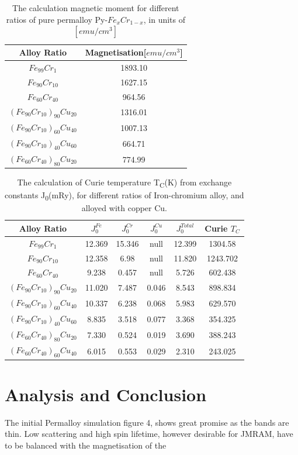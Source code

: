 \documentclass[12pt]{article}
\begin{document}
\begin{table}[h!]
\centering
 \begin{tabular}{||c c||} 
 \hline
 Alloy Ratio & Magnetisation[$emu/cm^3$] \\ [1ex] 
 \hline\hline
 $Fe_{99}Cr_1$ & 1893.10\\ 
 $Fe_{90}Cr_{10}$ & 1627.15\\
 $Fe_{60}Cr_{40}$ & 964.56 \\
 $(Fe_{90}Cr_{10})_{90}Cu_{20}$ & 1316.01\\ 
 $(Fe_{90}Cr_{10})_{60}Cu_{40}$ & 1007.13\\  
 $(Fe_{90}Cr_{10})_{40}Cu_{60}$ & 664.71\\
 $(Fe_{60}Cr_{40})_{80}Cu_{20}$ & 774.99\\ [1ex]
 \hline
 \end{tabular}
\caption{The calculation magnetic moment for different ratios of pure permalloy Py-$Fe_{x}Cr_{1-x}$, in units of $[emu/cm^3]$} 
\end{table}

\begin{table}[h!]
\centering
 \begin{tabular}{||c c c c c c||} 
 \hline
 Alloy Ratio & $J_0^{Fe}$ & $J_0^{Cr}$ & $J_0^{Cu}$ & $J_0^{Total}$ & Curie $T_C$ \\ [1ex] 
 \hline\hline
 $Fe_{99}Cr_1$ & 12.369 & 15.346 & null & 12.399 & 1304.58 \\ 
 $Fe_{90}Cr_{10}$ & 12.358 & 6.98 & null & 11.820 & 1243.702\\
 $Fe_{60}Cr_{40}$ & 9.238 & 0.457 & null & 5.726 & 602.438 \\
 $(Fe_{90}Cr_{10})_{90}Cu_{20}$ & 11.020 & 7.487 & 0.046 & 8.543 & 898.834 \\ 
 $(Fe_{90}Cr_{10})_{60}Cu_{40}$ & 10.337 & 6.238 & 0.068 & 5.983 & 629.570 \\
 $(Fe_{90}Cr_{10})_{40}Cu_{60}$ & 8.835 & 3.518 & 0.077 & 3.368 & 354.325 \\ 
 $(Fe_{60}Cr_{40})_{80}Cu_{20}$ & 7.330 & 0.524 & 0.019 & 3.690 & 388.243 \\
 $(Fe_{60}Cr_{40})_{60}Cu_{40}$ & 6.015 & 0.553 & 0.029 & 2.310 & 243.025 \\ [1ex]
 \hline
 \end{tabular}
\caption{The calculation of Curie temperature T\textsubscript{C}(K) from exchange constants J\textsubscript{0}(mRy), for different ratios of Iron-chromium alloy, and alloyed with copper Cu.} 
\end{table}
\clearpage








\section{Analysis and Conclusion}

The initial Permalloy simulation figure 4, shows great promise as the bands are thin. Low scattering and high spin lifetime, however desirable for JMRAM, have to be balanced with the magnetisation of the 











\clearpage
\printbibliography
\end{document}
